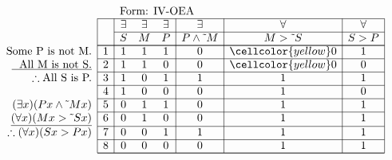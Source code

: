 \documentclass[10pt,legalpaper,landscape,cmtt]{article}
\begin{document}
{\begin{minipage}[t]{3.25in}
	\(
	\begin{array}{r|c|ccc|c|c|c|}
		\multicolumn{2}{c}{}&\multicolumn{6}{l}{\mbox{Form: IV-OEA}} \\ \cline{2-8}
		\hspace{1in}	&	& \exists & \exists & \exists & \exists & \forall & \forall\\ \cline{3-8}
		&	& S & M & P &  P \wedge \tilde~M  &  M > \tilde~S  &  S > P \\ \cline{2-8} \cline{2-8}
		\phantom{\therefore}\mbox{Some P is not M.}   & 1 & 1 & 1 & 1 &   0   &   \cellcolor{yellow} 0   &   1  \\ \cline{2-8}
		\underline{\phantom{\therefore}\mbox{All M is not S.}}   & 2 & 1 & 1 & 0 &   0   &   \cellcolor{yellow} 0   &   0  \\ \cline{2-8}
		\therefore \mbox{All S is P.}   & 3 & 1 & 0 & 1 &   1   &   1   &   1  \\ \cline{2-8}
		& 4 & 1 & 0 & 0 &   0   &   1   &   0  \\ \cline{2-8}
		(\exists x)(Px \wedge \tilde~Mx)   & 5 & 0 & 1 & 1 &   0   &   1   &   1  \\ \cline{2-8}
		\underline{(\forall x)(Mx > \tilde~Sx)}   & 6 & 0 & 1 & 0 &   0   &   1   &   1  \\ \cline{2-8}
		\therefore(\forall x)(Sx > Px)   & 7 & 0 & 0 & 1 &   1   &   1   &   1  \\ \cline{2-8}
		& 8 & 0 & 0 & 0 &   0   &   1   &   1   \\ \cline{2-8}\cline{2-8} 
	\end{array}
	\)
\end{minipage}

}
\end{document}
